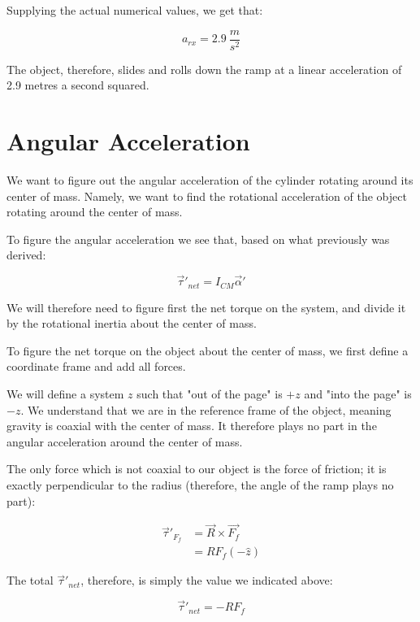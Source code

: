 \documentclass[letterpaper]{article}
\begin{document}
Supplying the actual numerical values, we get that:

\begin{equation}
   a_{rx} = 2.9\ \frac{m}{s^2}
\end{equation}

The object, therefore, slides and rolls down the ramp at a linear acceleration of 2.9 metres a second squared.

\section{Angular Acceleration}
\label{sec:org4b9621e}
We want to figure out the angular acceleration of the cylinder rotating around its center of mass. Namely, we want to find the rotational acceleration of the object rotating around the center of mass.

To figure the angular acceleration we see that, based on what previously was derived:

\begin{equation}
   \vec{\tau}'_{net} = I_{CM} \vec{\alpha}' 
\end{equation}

We will therefore need to figure first the net torque on the system, and divide it by the rotational inertia about the center of mass.

To figure the net torque on the object about the center of mass, we first define a coordinate frame and add all forces.

We will define a system \(z\) such that "out of the page" is \(+z\) and "into the page" is \(-z\). We understand that we are in the reference frame of the object, meaning gravity is coaxial with the center of mass. It therefore plays no part in the angular acceleration around the center of mass.

The only force which is not coaxial to our object is the force of friction; it is exactly perpendicular to the radius (therefore, the angle of the ramp plays no part):

\begin{align}
   \vec{\tau}'_F_f &= \vec{R} \times \vec{F_f}\\
&= RF_f(-\hat{z})
\end{align}

The total \(\vec{\tau}'_{net}\), therefore, is simply the value we indicated above:

\begin{equation}
   \vec{\tau}'_{net} =  - RF_f
\end{equation}
\end{document}
